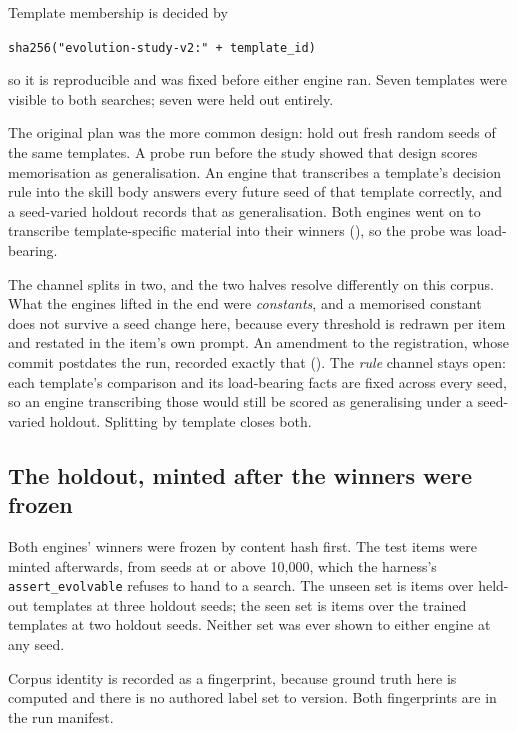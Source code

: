 Template membership is decided by

\begin{center}
\texttt{sha256("evolution-study-v2:"\,+\,template\_id)}
\end{center}

\noindent so it is reproducible and was fixed before either engine ran. Seven
templates were visible to both searches; seven were held out entirely.

The original plan was the more common design: hold out fresh random seeds of
the same templates. A probe run before the study showed that design scores
memorisation as generalisation. An engine that transcribes a template's
decision rule into the skill body answers every future seed of that template
correctly, and a seed-varied holdout records that as generalisation. Both
engines went on to transcribe template-specific material into their winners
(), so the probe was load-bearing.

The channel splits in two, and the two halves resolve differently on this
corpus. What the engines lifted in the end were \emph{constants}, and a
memorised constant does not survive a seed change here, because every
threshold is redrawn per item and restated in the item's own prompt. An
amendment to the registration, whose commit postdates the run, recorded
exactly that (). The \emph{rule} channel stays open: each template's
comparison and its load-bearing facts are fixed across every seed, so an
engine transcribing those would still be scored as generalising under a
seed-varied holdout. Splitting by template closes both.

\subsection{The holdout, minted after the winners were frozen}

Both engines' winners were frozen by content hash first. The test items were
minted afterwards, from seeds at or above 10{,}000, which the harness's
\texttt{assert\_evolvable} refuses to hand to a search. The unseen set is
\NUM{\unseenItems} items over \NUM{\templatesUnseen} held-out templates at
three holdout seeds; the seen set is \NUM{\seenItems} items over the
\NUM{\templatesSeen} trained templates at two holdout seeds. Neither set was
ever shown to either engine at any seed.

Corpus identity is recorded as a fingerprint, because ground truth here is
computed and there is no authored label set to version. Both fingerprints are
in the run manifest.

